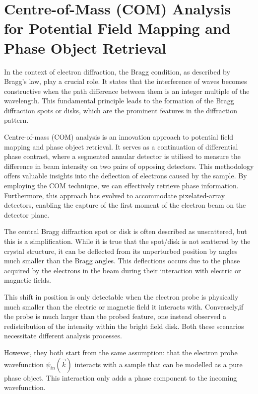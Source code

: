 
\chapter{Centre-of-Mass (COM) Analysis for Potential Field Mapping and Phase Object Retrieval}
%
In the context of electron diffraction, the Bragg condition, as described by Bragg's law, play a crucial role. It states that the interference of waves becomes constructive when the path difference between them is an integer multiple of the wavelength. This fundamental principle leads to the formation of the Bragg diffraction spots or disks, which are the prominent features in the diffraction pattern.

Centre-of-mass (COM) analysis is an innovation approach to potential field mapping and phase object retrieval. 
%
It serves as a continuation of differential phase contrast, where a segmented annular detector is utilised to measure the difference in beam intensity on two pairs of opposing detectors. 
%
This methodology offers valuable insights into the deflection of electrons caused by the sample. 
%
By employing the COM technique, we can effectively  retrieve phase information. 
%
Furthermore, this approach has evolved to accommodate pixelated-array detectors, enabling the capture of the first moment of the electron beam on the detector plane. 

The central Bragg diffraction spot or disk is often described as unscattered, but this is a simplification. 
%
While it is true that the spot/disk is not scattered by the crystal structure, it can be deflected from its  unperturbed position by angles much smaller than the Bragg angles. 
%
This deflections occurs due to the phase acquired by the electrons in the beam during their interaction with electric or magnetic fields.

This shift in position is only detectable when the electron probe is physically much smaller than the electric or magnetic field it interacts with.
%
Conversely,if the probe is much larger than the probed feature, one instead observed a redistribution of the intensity within the bright field disk.
%
Both these scenarios necessitate different analysis processes.

However, they both start from the same assumption: that the electron probe wavefunction $\psi_{in}(\vec{k})$ interacts with a sample that can be modelled as a pure phase object. This interaction only adds a phase component to the incoming wavefunction\cite{caoTheoryPracticeElectron2018, lazicPhaseContrastSTEM2016}. 


